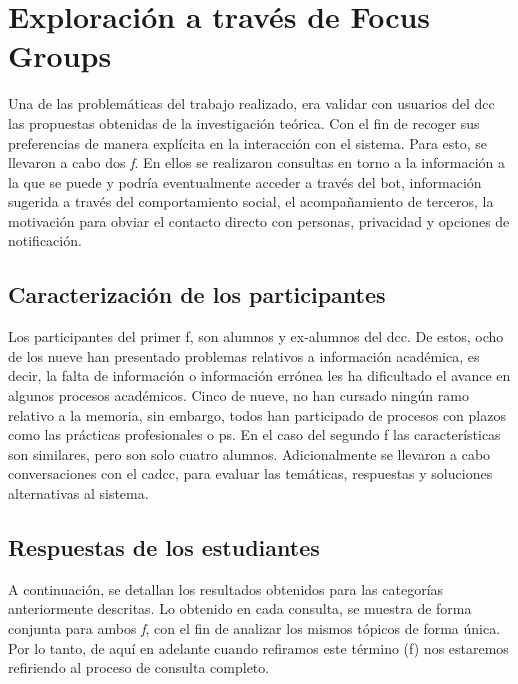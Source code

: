 \section{Exploración a través de Focus Groups}
    \par Una de las problemáticas del trabajo realizado, era validar con usuarios del \acrshort{dcc} las propuestas obtenidas de la investigación teórica. Con el fin de recoger sus preferencias de manera explícita en la interacción con el sistema. Para esto, se llevaron a cabo dos \textit{\acrlong{f}}. En ellos se realizaron consultas en torno a la información a la que se puede y podría eventualmente acceder a través del bot, información sugerida a través del comportamiento social, el acompañamiento de terceros, la motivación para obviar el contacto directo con personas, privacidad y opciones de notificación.
    
    \subsection{Caracterización de los participantes}
    \par Los participantes del primer \acrshort{f}, son alumnos y ex-alumnos del \acrshort{dcc}. De estos, ocho de los nueve han presentado problemas relativos a información académica, es decir, la falta de información o información errónea les ha dificultado el avance en algunos procesos académicos. Cinco de nueve, no han cursado ningún ramo relativo a la memoria, sin embargo, todos han participado de procesos con plazos como las prácticas profesionales o \acrlong{ps}. En el caso del segundo \acrlong{f} las características son similares, pero son solo cuatro alumnos. Adicionalmente se llevaron a cabo conversaciones con el \acrshort{cadcc}, para evaluar las temáticas, respuestas y soluciones alternativas al sistema.
    
    \subsection{Respuestas de los estudiantes}
    \par A continuación, se detallan los resultados obtenidos para las categorías anteriormente descritas. Lo obtenido en cada consulta, se muestra de forma conjunta para ambos \textit{\acrlong{f}}, con el fin de analizar los mismos tópicos de forma única. Por lo tanto, de aquí en adelante cuando refiramos este término (\acrlong{f}) nos estaremos refiriendo al proceso de consulta completo.
    
